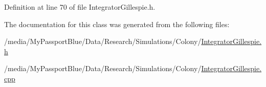 \-Definition at line 70 of file \-Integrator\-Gillespie.\-h.



\-The documentation for this class was generated from the following files\-:\begin{DoxyCompactItemize}
\item 
/media/\-My\-Passport\-Blue/\-Data/\-Research/\-Simulations/\-Colony/\hyperlink{_integrator_gillespie_8h}{\-Integrator\-Gillespie.\-h}\item 
/media/\-My\-Passport\-Blue/\-Data/\-Research/\-Simulations/\-Colony/\hyperlink{_integrator_gillespie_8cpp}{\-Integrator\-Gillespie.\-cpp}\end{DoxyCompactItemize}
